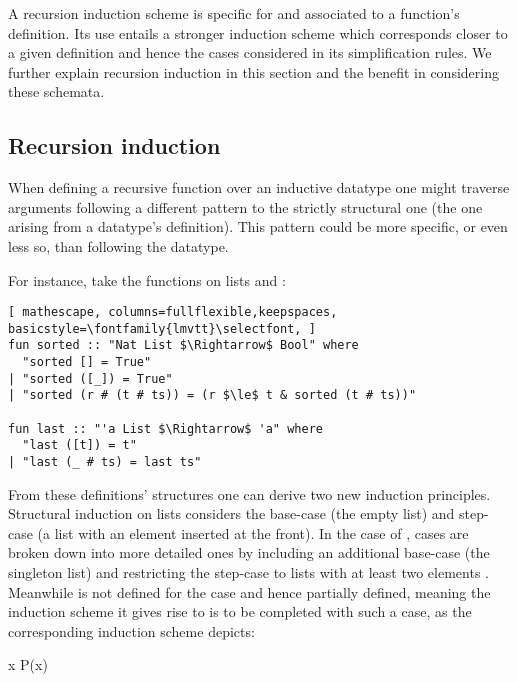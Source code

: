 \label{sec:rec-ind}

A recursion induction scheme is specific for and associated to a function's definition.
%
Its use entails a stronger induction scheme which corresponds closer to a given definition and hence the cases considered in its simplification rules.
%
We further explain recursion induction in this section and the benefit in considering these schemata.

\subsection{Recursion induction}

When defining a recursive function over an inductive datatype one might traverse arguments following a different pattern to the strictly structural one (the one arising from a datatype's definition).
%
This pattern could be more specific, or even less so, than following the datatype.

For instance, take the functions on lists  and :

\begin{lstlisting}[ mathescape, columns=fullflexible,keepspaces, basicstyle=\fontfamily{lmvtt}\selectfont, ]
fun sorted :: "Nat List $\Rightarrow$ Bool" where
  "sorted [] = True"
| "sorted ([_]) = True"
| "sorted (r # (t # ts)) = (r $\le$ t & sorted (t # ts))"

fun last :: "'a List $\Rightarrow$ 'a" where
  "last ([t]) = t"
| "last (_ # ts) = last ts"
\end{lstlisting}

\noindent From these definitions' structures one can derive two new induction principles.
%
Structural induction on lists considers the base-case \isaCode{[]} (the empty list) and step-case  (a list with an element inserted at the front).
%
In the case of , cases are broken down into more detailed ones by including an additional base-case \isaCode{[t]} (the singleton list) and restricting the step-case to lists with at least two elements .
%
Meanwhile  is not defined for the case \isaCode{[]} and hence partially defined, meaning the induction scheme it gives rise to is to be completed with such a case, as the corresponding induction scheme depicts:

\vspace{2 mm}

  {\forall x \;\; P\;(x)}

